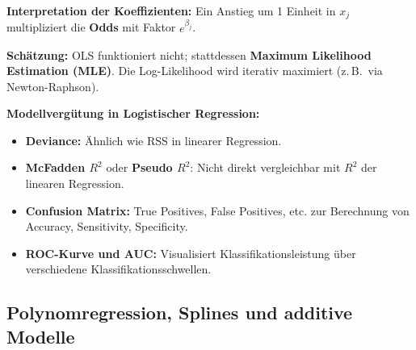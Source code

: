 
\textbf{Interpretation der Koeffizienten:} Ein Anstieg um 1 Einheit in $x_j$ multipliziert die \textbf{Odds} mit Faktor $e^{\beta_j}$.

\textbf{Schätzung:} OLS funktioniert nicht; stattdessen \textbf{Maximum Likelihood Estimation (MLE)}. Die Log-Likelihood wird iterativ maximiert (z.\,B.\ via Newton-Raphson).

\textbf{Modellvergütung in Logistischer Regression:}
\begin{itemize}[leftmargin=1.5em]
    \item \textbf{Deviance:} Ähnlich wie RSS in linearer Regression.
    \item \textbf{McFadden $R^2$} oder \textbf{Pseudo $R^2$}: Nicht direkt vergleichbar mit $R^2$ der linearen Regression.
    \item \textbf{Confusion Matrix:} True Positives, False Positives, etc. zur Berechnung von Accuracy, Sensitivity, Specificity.
    \item \textbf{ROC-Kurve und AUC:} Visualisiert Klassifikationsleistung über verschiedene Klassifikationsschwellen.
\end{itemize}

\newpage




\subsection{Polynomregression, Splines und additive Modelle}

